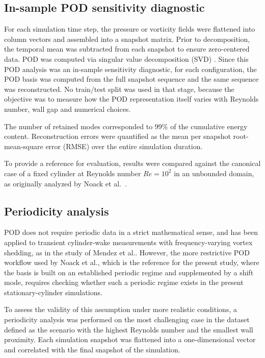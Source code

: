 \documentclass[preprint,12pt]{elsarticle}
\begin{document}
\subsection{In-sample POD sensitivity diagnostic}
\label{subsec3.2}
For each simulation time step, the pressure or vorticity fields were flattened into column vectors and assembled into a snapshot matrix. Prior to decomposition, the temporal mean was subtracted from each snapshot to ensure zero-centered data. POD was computed via singular value decomposition (SVD) \citep{Harris2020}. Since this POD analysis was an in-sample sensitivity diagnostic, for each configuration, the POD basis was computed from the full snapshot sequence and the same sequence was reconstructed. No train/test split was used in that stage, because the objective was to measure how the POD representation itself varies with Reynolds number, wall gap and numerical choices.


The number of retained modes corresponded to 99\% of the cumulative energy content. Reconstruction errors were quantified as the mean per snapshot root-mean-square error (RMSE) over the entire simulation duration.

To provide a reference for evaluation, results were compared against the canonical case of a fixed cylinder at Reynolds number $Re=10^2$ in an unbounded domain, as originally analyzed by Noack et al.~\citep{Noack2003}.

\subsection{Periodicity analysis}
\label{subsec3.4}
POD does not require periodic data in a strict mathematical sense, and has been applied to transient cylinder-wake measurements with frequency-varying vortex shedding, as in the study of Mendez et al.\citep{Mendez2020}. However, the more restrictive POD workflow used by Noack et al.\citep{Noack2003}, which is the reference for the present study, where the basis is built on an established periodic regime and supplemented by a shift mode, requires checking whether such a periodic regime exists in the present stationary-cylinder simulations. 

To assess the validity of this assumption under more realistic conditions, a periodicity analysis was performed on the most challenging case in the dataset defined as the scenario with the highest Reynolds number and the smallest wall proximity. Each simulation snapshot was flattened into a one-dimensional vector and correlated with the final snapshot of the simulation.
\end{document}

